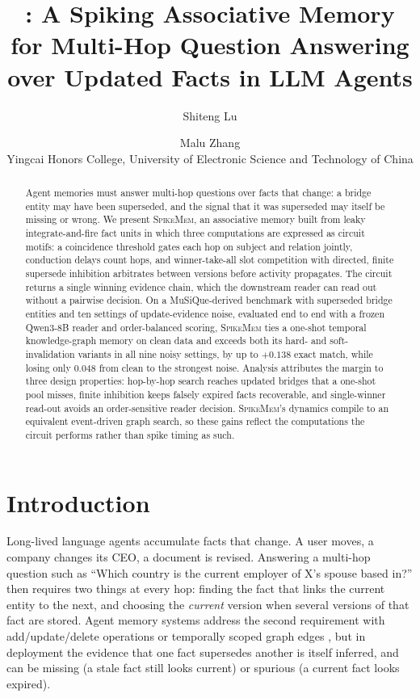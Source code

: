\documentclass[11pt]{article}
\title{\sm: A Spiking Associative Memory for Multi-Hop Question Answering\\
over Updated Facts in LLM Agents}
\author{
  Shiteng Lu \and Malu Zhang \\
  Yingcai Honors College, University of Electronic Science and Technology of China
}
\newcommand{\sm}{\textsc{SpikeMem}}
\begin{document}
\maketitle

\begin{abstract}
Agent memories must answer multi-hop questions over facts that change: a bridge entity may have
been superseded, and the signal that it was superseded may itself be missing or wrong. We present
\sm{}, an associative memory built from leaky integrate-and-fire fact units in which three
computations are expressed as circuit motifs: a coincidence threshold gates each hop on subject and
relation jointly, conduction delays count hops, and winner-take-all slot competition with directed,
finite supersede inhibition arbitrates between versions before activity propagates. The circuit
returns a single winning evidence chain, which the downstream reader can read out without a pairwise
decision. On a MuSiQue-derived benchmark with superseded bridge entities and ten settings of
update-evidence noise, evaluated end to end with a frozen Qwen3-8B reader and order-balanced scoring,
\sm{} ties a one-shot temporal knowledge-graph memory on clean data and exceeds both its hard- and
soft-invalidation variants in all nine noisy settings, by up to $+0.138$ exact match, while losing
only $0.048$ from clean to the strongest noise. Analysis attributes the margin to three design
properties: hop-by-hop search reaches updated bridges that a one-shot pool misses, finite inhibition
keeps falsely expired facts recoverable, and single-winner read-out avoids an order-sensitive reader
decision. \sm{}'s dynamics compile to an equivalent event-driven graph search, so these gains reflect
the computations the circuit performs rather than spike timing as such.
\end{abstract}

\section{Introduction}

Long-lived language agents accumulate facts that change. A user moves, a company changes its CEO,
a document is revised. Answering a multi-hop question such as ``Which country is the current
employer of X's spouse based in?'' then requires two things at every hop: finding the fact that links
the current entity to the next, and choosing the \emph{current} version when several versions of that
fact are stored. Agent memory systems address the second requirement with add/update/delete
operations \citep{chhikara2025mem0} or temporally scoped graph edges \citep{rasmussen2025zep}, but in
deployment the evidence that one fact supersedes another is itself inferred, and can be missing (a
stale fact still looks current) or spurious (a current fact looks expired).
\end{document}
